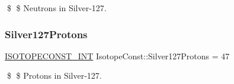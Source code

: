 \$ \$ Neutrons in Silver-\/127. \mbox{\label{group___isotope_const-_silver-_ag127_ga0e123f13df7d328e53741d565f07c18b}} 
\subsubsection{\texorpdfstring{Silver127\+Protons}{Silver127Protons}}
{\footnotesize\ttfamily \mbox{\hyperlink{group___isotope_const-_macros_ga5f18360b3e99483a35c32d789e62621c}{I\+S\+O\+T\+O\+P\+E\+C\+O\+N\+S\+T\+\_\+\+I\+NT}} Isotope\+Const\+::\+Silver127\+Protons = 47}

\$ \$ Protons in Silver-\/127. 